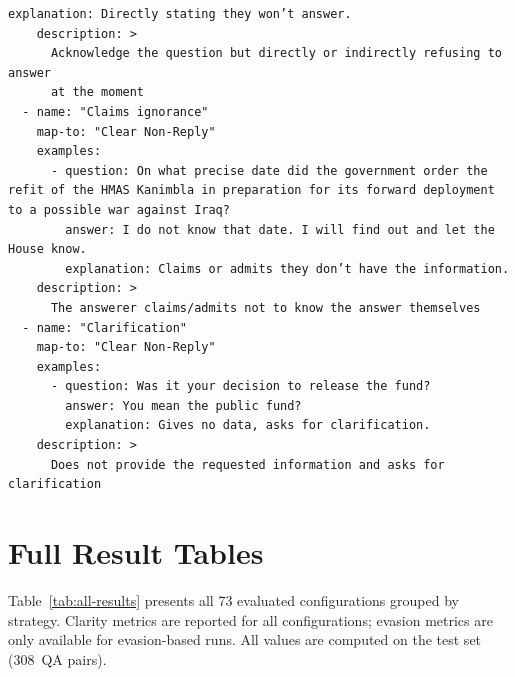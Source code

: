 \documentclass[11pt]{article}
\begin{document}
\begin{lstlisting}[style=yaml]
        explanation: Directly stating they won’t answer.
    description: >
      Acknowledge the question but directly or indirectly refusing to answer
      at the moment
  - name: "Claims ignorance"
    map-to: "Clear Non-Reply"
    examples:
      - question: On what precise date did the government order the refit of the HMAS Kanimbla in preparation for its forward deployment to a possible war against Iraq?
        answer: I do not know that date. I will find out and let the House know.
        explanation: Claims or admits they don’t have the information.
    description: >
      The answerer claims/admits not to know the answer themselves
  - name: "Clarification"
    map-to: "Clear Non-Reply"
    examples:
      - question: Was it your decision to release the fund?
        answer: You mean the public fund?
        explanation: Gives no data, asks for clarification.
    description: >
      Does not provide the requested information and asks for clarification
\end{lstlisting}

\section{Full Result Tables}
\label{sec:appendix-results}

Table~\ref{tab:all-results} presents all 73 evaluated configurations grouped by strategy.
Clarity metrics are reported for all configurations; evasion metrics are only available for evasion-based runs.
All values are computed on the test set (308~QA pairs).
\end{document}
